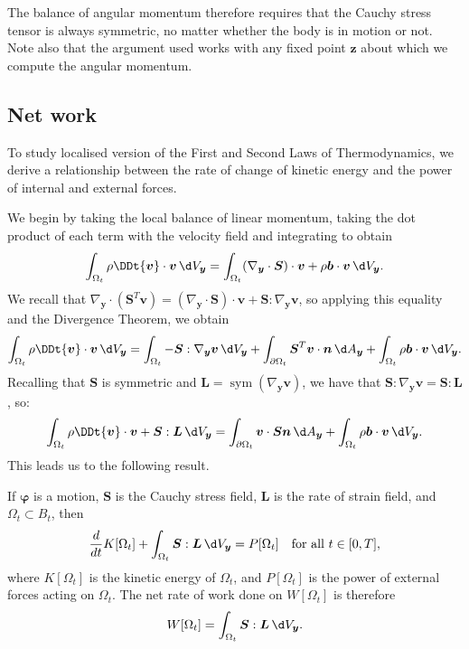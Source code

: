 \documentclass[
  letterpaper,
  DIV=11,
  numbers=noendperiod]{scrreprt}
\theoremstyle{plain}
\theoremstyle{remark}
\begin{document}
The balance of angular momentum therefore requires that the Cauchy
stress tensor is always symmetric, no matter whether the body is in
motion or not. Note also that the argument used works with any fixed
point \({\boldsymbol{z}}\) about which we compute the angular momentum.

\subsection{Net work}\label{net-work}

To study localised version of the First and Second Laws of
Thermodynamics, we derive a relationship between the rate of change of
kinetic energy and the power of internal and external forces.

We begin by taking the local balance of linear momentum, taking the dot
product of each term with the velocity field and integrating to obtain
\[\int_{\Omega_t}\rho\DDt{\boldsymbol{v}}\cdot{\boldsymbol{v}}{\,\d V_{{\boldsymbol{y}}}}= \int_{\Omega_t}(\nabla_{\boldsymbol{y}}\cdot{\boldsymbol{S}})\cdot{\boldsymbol{v}}+\rho{\boldsymbol{b}}\cdot{\boldsymbol{v}}{\,\d V_{{\boldsymbol{y}}}}.\]
We recall that
\(\nabla_{\boldsymbol{y}}\cdot({\boldsymbol{S}}^T{\boldsymbol{v}}) = (\nabla_{\boldsymbol{y}}\cdot{\boldsymbol{S}})\cdot{\boldsymbol{v}}+{\boldsymbol{S}}:\nabla_{\boldsymbol{y}}{\boldsymbol{v}}\),
so applying this equality and the Divergence Theorem, we obtain
\[\int_{\Omega_t}\rho\DDt{\boldsymbol{v}}\cdot{\boldsymbol{v}}{\,\d V_{{\boldsymbol{y}}}}= \int_{\Omega_t}-{\boldsymbol{S}}:\nabla_{\boldsymbol{y}}{\boldsymbol{v}}{\,\d V_{{\boldsymbol{y}}}}+\int_{\partial\Omega_t}{\boldsymbol{S}}^T{\boldsymbol{v}}\cdot{\boldsymbol{n}}{\,\d A_{{\boldsymbol{y}}}}+\int_{\Omega_t}\rho{\boldsymbol{b}}\cdot{\boldsymbol{v}}{\,\d V_{{\boldsymbol{y}}}}.\]
Recalling that \({\boldsymbol{S}}\) is symmetric and
\({\boldsymbol{L}}= {\operatorname{sym}}(\nabla_{\boldsymbol{y}}{\boldsymbol{v}})\),
we have that
\({\boldsymbol{S}}:\nabla_{\boldsymbol{y}}{\boldsymbol{v}}= {\boldsymbol{S}}:{\boldsymbol{L}}\),
so:
\[\int_{\Omega_t}\rho\DDt{\boldsymbol{v}}\cdot{\boldsymbol{v}}+{\boldsymbol{S}}:{\boldsymbol{L}}{\,\d V_{{\boldsymbol{y}}}}= \int_{\partial\Omega_t}{\boldsymbol{v}}\cdot{\boldsymbol{S}}{\boldsymbol{n}}{\,\d A_{{\boldsymbol{y}}}}+\int_{\Omega_t}\rho{\boldsymbol{b}}\cdot{\boldsymbol{v}}{\,\d V_{{\boldsymbol{y}}}}.\]
This leads us to the following result.

If \({\boldsymbol{\varphi}}\) is a motion, \({\boldsymbol{S}}\) is the
Cauchy stress field, \({\boldsymbol{L}}\) is the rate of strain field,
and \(\Omega_t\subset B_t\), then
\[\frac{d}{dt}K[\Omega_t]+\int_{\Omega_t} {\boldsymbol{S}}:{\boldsymbol{L}}{\,\d V_{{\boldsymbol{y}}}}= P[\Omega_t]\quad\text{for all }t\in[0,T],\]
where \(K[\Omega_t]\) is the kinetic energy of \(\Omega_t\), and
\(P[\Omega_t]\) is the power of external forces acting on \(\Omega_t\).
The net rate of work done on \(W[\Omega_t]\) is therefore
\[W[\Omega_t] = \int_{\Omega_t} {\boldsymbol{S}}:{\boldsymbol{L}}{\,\d V_{{\boldsymbol{y}}}}.\]
\end{document}
